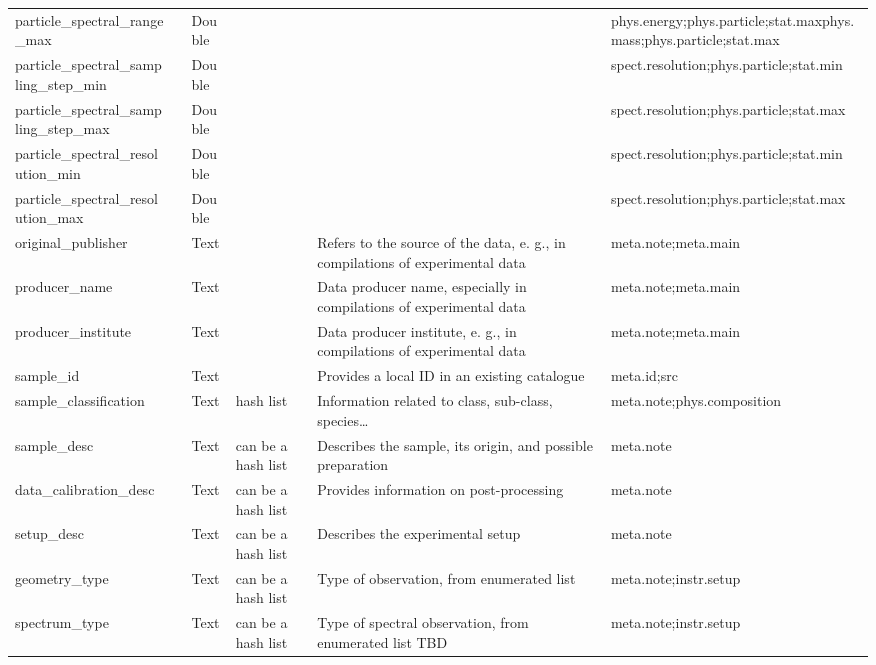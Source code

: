 \documentclass[11pt,a4paper]{ivoa}
\begin{document}
\begin{longtable}{p{3.5cm}p{0.5cm}p{1cm}p{1cm}p{7cm}p{3cm}}
particle\_spectral\_range\_max&&Double&&&phys.energy;phys.particle;stat.maxphys.mass;phys.particle;stat.max\\

particle\_spectral\_sampling\_step\_min&&Double&&&spect.resolution;phys.particle;stat.min \\

particle\_spectral\_sampling\_step\_max&&Double&&&spect.resolution;phys.particle;stat.max \\

particle\_spectral\_resolution\_min&&Double&&&spect.resolution;phys.particle;stat.min \\

particle\_spectral\_resolution\_max&&Double&&&spect.resolution;phys.particle;stat.max \\

original\_publisher&&Text&&Refers to the source of the data, e. g.,  in compilations of experimental data&meta.note;meta.main\\

producer\_name&&Text&&Data producer name, especially in compilations of experimental data&meta.note;meta.main\\

producer\_institute&&Text&&Data producer institute, e. g., in compilations of experimental data&meta.note;meta.main\\

sample\_id&&Text&&Provides a local ID in an existing catalogue &meta.id;src\\

sample\_classification&&Text&hash list&Information related to class, sub-class, species… &meta.note;phys.composition\\

sample\_desc&&Text&can be a hash list&Describes the sample, its origin, and possible preparation&meta.note\\

data\_calibration\_desc&&Text&can be a hash list&Provides information on post-processing &meta.note\\

setup\_desc&&Text&can be a hash list&Describes the experimental setup &meta.note\\

geometry\_type&&Text&can be a hash list&Type of observation, from enumerated list&meta.note;instr.setup\\

spectrum\_type&&Text&can be a hash list&Type of spectral observation, from enumerated list TBD&meta.note;instr.setup\\


\end{longtable}
\end{document}
